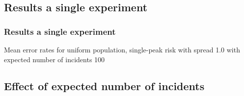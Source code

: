 \documentclass[notheorems]{beamer}
\theoremstyle{definition}
\theoremstyle{example}
\begin{document}
\subsection{Results a single experiment}
\begin{frame}\frametitle{Results a single experiment}
    \begin{table}
        \centering
        \footnotesize
        
        \caption
            {Mean error rates for uniform population, single-peak risk with spread 1.0 with expected number of incidents 100}
    \end{table}
\end{frame}


\subsection{Effect of expected number of incidents}
\end{document}
